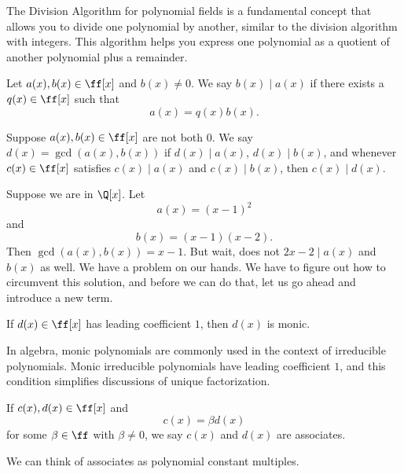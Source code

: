 The Division Algorithm for polynomial fields is a fundamental concept that allows you to divide one polynomial by another, similar to the division algorithm with integers.
This algorithm helps you express one polynomial as a quotient of another polynomial plus a remainder.

\begin{definition}
    Let $a(x),b(x)\in\ff[x]$ and $b(x)\neq 0$.
    We say $b(x)\mid a(x)$ if there exists a $q(x)\in\ff[x]$ such that
    \[
        a(x)=q(x)b(x).
    \]
\end{definition}

\begin{definition}
    Suppose $a(x),b(x)\in\ff[x]$ are not both $0$.
    We say $d(x)=\gcd(a(x),b(x))$ if $d(x)\mid a(x)$, $d(x)\mid b(x)$, and whenever $c(x)\in\ff[x]$ satisfies $c(x)\mid a(x)$ and $c(x)\mid b(x)$, then $c(x)\mid d(x)$.
\end{definition}

Suppose we are in $\Q[x]$.
Let
\[
    a(x)=(x-1)^2
\]
and
\[
    b(x)=(x-1)(x-2).
\]
Then $\gcd(a(x),b(x))=x-1$.
But wait, does not $2x-2\mid a(x)$ and $b(x)$ as well.
We have a problem on our hands.
We have to figure out how to circumvent this solution, and before we can do that, let us go ahead and introduce a new term.

\begin{definition}[Monic]
    If $d(x)\in\ff[x]$ has leading coefficient $1$, then $d(x)$ is monic.
\end{definition}

In algebra, monic polynomials are commonly used in the context of irreducible polynomials.
Monic irreducible polynomials have leading coefficient $1$, and this condition simplifies discussions of unique factorization.

\begin{definition}
    If $c(x),d(x)\in\ff[x]$ and
    \[
        c(x)=\beta d(x)
    \]
    for some $\beta\in\ff$ with $\beta\neq 0$, we say $c(x)$ and $d(x)$ are associates.
\end{definition}

We can think of associates as polynomial constant multiples.

